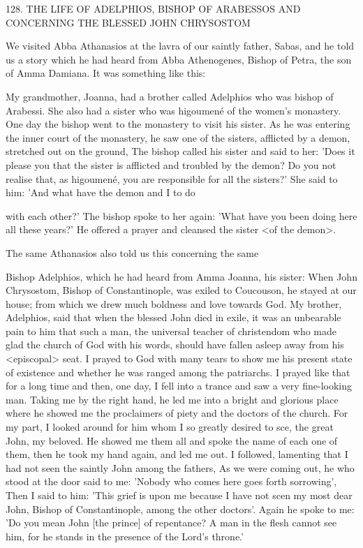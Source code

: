 128. THE LIFE OF ADELPHIOS,
BISHOP OF ARABESSOS
AND CONCERNING THE BLESSED
JOHN CHRYSOSTOM

We visited Abba Athanasios at the lavra of our saintly father,
Sabas, and he told us a story which he had heard from Abba
Athenogenes, Bishop of Petra, the son of Amma Damiana. It was
something like this:

My grandmother, Joanna, had a brother called Adelphios who was
bishop of Arabessi. She also had a sister who was higoumené of the
women's monastery. One day the bishop went to the monastery to
visit his sister. As he was entering the inner court of the monastery,
he saw one of the sisters, afflicted by a demon, stretched out on the
ground, The bishop called his sister and said to her: 'Does it please
you that the sister is afflicted and troubled by the demon? Do you
not realise that, as higoumené, you are responsible for all the
sisters?' She said to him: 'And what have the demon and I to do

with each other?' The bishop spoke to her again: 'What have you
been doing here all these years?' He offered a prayer and cleansed
the sister <of the demon>.

The same Athanasios also told us this concerning the same

Bishop Adelphios, which he had heard from Amma Joanna, his
sister:
When John Chrysostom, Bishop of Constantinople, was exiled to
Coucouson, he stayed at our house; from which we drew much
boldness and love towards God. My brother, Adelphios, said that
when the blessed John died in exile, it was an unbearable pain to
him that such a man, the universal teacher of christendom who
made glad the church of God with his words, should have fallen
asleep away from his <episcopal> seat. I prayed to God with many
tears to show me his present state of existence and whether he was
ranged among the patriarchs. I prayed like that for a long time and
then, one day, I fell into a trance and saw a very fine-looking man.
Taking me by the right hand, he led me into a bright and glorious
place where he showed me the proclaimers of piety and the doctors
of the church. For my part, I looked around for him whom I so
greatly desired to sce, the great John, my beloved. He showed me
them all and spoke the name of each one of them, then he took my
hand again, and led me out. I followed, lamenting that I had not
seen the saintly John among the fathers, As we were coming out, he
who stood at the door said to me: 'Nobody who comes here goes
forth sorrowing', Then I said to him: 'This grief is upon me because
I have not scen my most dear John, Bishop of Constantinople,
among the other doctors'. Again he spoke to me: 'Do you mean
John [the prince] of repentance? A man in the flesh cannot see him,
for he stands in the presence of the Lord's throne.'


